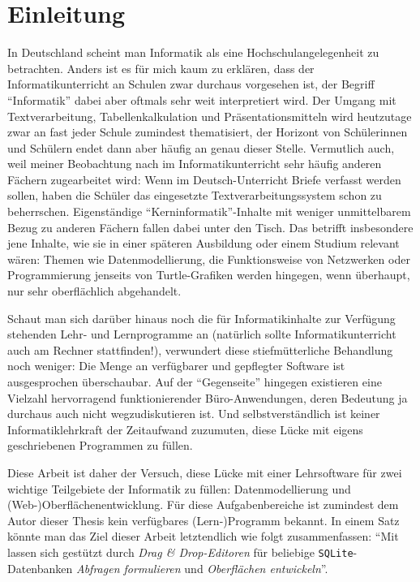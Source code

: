 \section{Einleitung}
\label{sec:introduction}

In Deutschland scheint man Informatik als eine Hochschulangelegenheit zu betrachten. Anders ist es für mich kaum zu erklären, dass der Informatikunterricht an Schulen zwar durchaus vorgesehen ist, der Begriff ``Informatik'' dabei aber oftmals sehr weit interpretiert wird. Der Umgang mit Textverarbeitung, Tabellenkalkulation und Präsentationsmitteln wird heutzutage zwar an fast jeder Schule zumindest thematisiert, der Horizont von Schülerinnen und Schülern endet dann aber häufig an genau dieser Stelle. Vermutlich auch, weil meiner Beobachtung nach im Informatikunterricht sehr häufig anderen Fächern zugearbeitet wird: Wenn im Deutsch-Unterricht Briefe verfasst werden sollen, haben die Schüler das eingesetzte Textverarbeitungssystem schon zu beherrschen. Eigenständige "`Kerninformatik"'-Inhalte mit weniger unmittelbarem Bezug zu anderen Fächern fallen dabei unter den Tisch. Das betrifft insbesondere jene Inhalte, wie sie in einer späteren Ausbildung oder einem Studium relevant wären: Themen wie Datenmodellierung, die Funktionsweise von Netzwerken oder Programmierung jenseits von Turtle-Grafiken werden hingegen, wenn überhaupt, nur sehr oberflächlich abgehandelt.

Schaut man sich darüber hinaus noch die für Informatikinhalte zur Verfügung stehenden Lehr- und Lernprogramme an (natürlich sollte Informatikunterricht auch am Rechner stattfinden!), verwundert diese stiefmütterliche Behandlung noch weniger: Die Menge an verfügbarer und gepflegter Software ist ausgesprochen überschaubar. Auf der "`Gegenseite"' hingegen existieren eine Vielzahl hervorragend funktionierender Büro-Anwendungen, deren Bedeutung ja durchaus auch nicht wegzudiskutieren ist. Und selbstverständlich ist keiner Informatiklehrkraft der Zeitaufwand zuzumuten, diese Lücke mit eigens geschriebenen Programmen zu füllen.

Diese Arbeit ist daher der Versuch, diese Lücke mit einer Lehrsoftware für zwei wichtige Teilgebiete der Informatik zu füllen: Datenmodellierung und (Web-)Ober\-flächen\-ent\-wick\-lung. Für diese Aufgabenbereiche ist zumindest dem Autor dieser Thesis kein verfügbares (Lern-)Programm bekannt. In einem Satz könnte man das Ziel dieser Arbeit letztendlich wie folgt zusammenfassen: "`Mit \idename{} lassen sich gestützt durch \textit{Drag \& Drop-Editoren} für beliebige \texttt{SQLite}-Datenbanken \textit{Abfragen formulieren} und \textit{Oberflächen entwickeln}"'.

